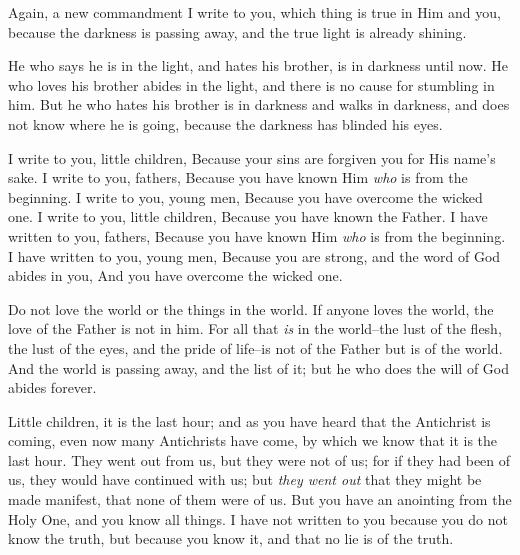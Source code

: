 \bverse Again, a new commandment I write to you, which thing is true in Him and you, because the darkness is passing away, and the true light is already shining.

\bverse He who says he is in the light, and hates his brother, is in darkness until now.
\bverse He who loves his brother abides in the light, and there is no cause for stumbling in him.
\bverse But he who hates his brother is in darkness and walks in darkness, and does not know where he is going, because the darkness has blinded his eyes.


\begin{bquotation}
\bverse I write to you, little children, Because your sins are forgiven you for His name's sake.
\bverse I write to you, fathers, Because you have known Him \textit{who} is from the beginning. I write to you, young men, Because you have overcome the wicked one. I write to you, little children, Because you have known the Father.
\bverse I have written to you, fathers, Because you have known Him \textit{who} is from the beginning. I have written to you, young men, Because you are strong, and the word of God abides in you, And you have overcome the wicked one.
\end{bquotation}


\bverse Do not love the world or the things in the world. If anyone loves the world, the love of the Father is not in him.
\bverse For all that \textit{is} in the world--the lust of the flesh, the lust of the eyes, and the pride of life--is not of the Father but is of the world.
\bverse  And the world is passing away, and the list of it; but he who does the will of God abides forever.


\bverse Little children, it is the last hour; and as you have heard that the Antichrist is coming, even now many Antichrists have come, by which we know that it is the last hour.
\bverse They went out from us, but they were not of us; for if they had been of us, they would have continued with us; but \textit{they went out} that they might be made manifest, that none of them were of us.
\bverse But you have an anointing from the Holy One, and you know all things. 
\bverse I have not written to you because you do not know the truth, but because you know it, and that no lie is of the truth.

